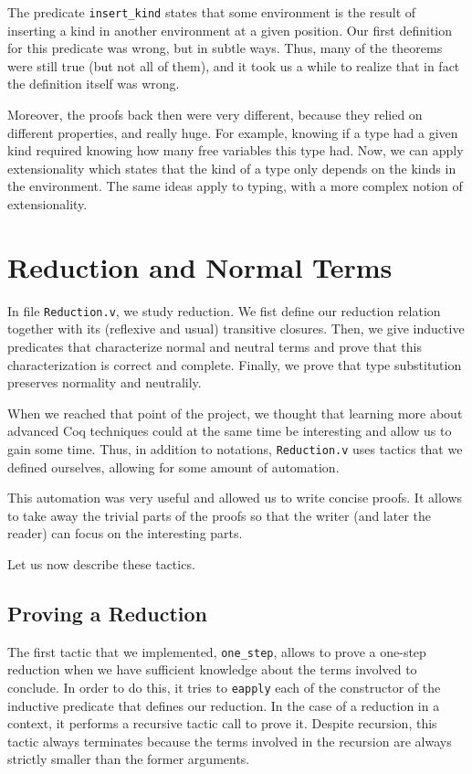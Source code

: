 \documentclass[a4paper,11pt]{article}
\begin{document}
The predicate \verb|insert_kind| states that some environment is the
result of inserting a kind in another environment at a given position.
Our first definition for this predicate was wrong, but in subtle
ways. Thus, many of the theorems were still true (but not all of
them), and it took us a while to realize that in fact the definition
itself was wrong.

Moreover, the proofs back then were very different, because they
relied on different properties, and really huge. For example,
knowing if a type had a given kind required knowing how many free
variables this type had. Now, we can apply extensionality which
states that the kind of a type only depends on the kinds in the
environment. The same ideas apply to typing, with a more complex
notion of extensionality.

\section{Reduction and Normal Terms}

In file \verb|Reduction.v|, we study reduction. We fist define our
reduction relation together with its (reflexive and usual) transitive
closures. Then, we give inductive predicates that characterize normal
and neutral terms and prove that this characterization is correct and
complete. Finally, we prove that type substitution preserves normality
and neutralily.

When we reached that point of the project, we thought that learning
more about advanced Coq techniques could at the same time be
interesting and allow us to gain some time. Thus, in addition to
notations, \verb|Reduction.v| uses tactics that we defined ourselves,
allowing for some amount of automation.

This automation was very useful and allowed us to write concise
proofs. It allows to take away the trivial parts of the proofs so that
the writer (and later the reader) can focus on the interesting parts.

Let us now describe these tactics.

\subsection{Proving a Reduction}

The first tactic that we implemented, \verb|one_step|, allows to prove
a one-step reduction when we have sufficient knowledge about the terms
involved to conclude. In order to do this, it tries to \verb|eapply|
each of the constructor of the inductive predicate that defines our
reduction. In the case of a reduction in a context, it performs a
recursive tactic call to prove it. Despite recursion, this tactic
always terminates because the terms involved in the recursion are
always strictly smaller than the former arguments.
\end{document}
